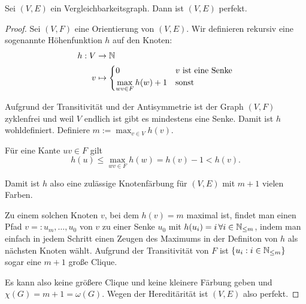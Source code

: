 \documentclass[../main.tex]{subfiles}
\begin{document}
\begin{satz}
    Sei $(V, E)$ ein Vergleichbarkeitsgraph. Dann ist $(V, E)$ perfekt.
\end{satz}
\begin{proof}
    Sei $(V, F)$ eine Orientierung von $(V, E)$. Wir definieren rekursiv eine sogenannte Höhenfunktion $h$ auf den Knoten:
    \begin{align*}
        h : V &\to \mathbb{N} \\
        v &\mapsto \begin{cases}
            0 &v \text{ ist eine Senke}\\
            \max\limits_{wv \in F} h(w) + 1 &\text {sonst}
        \end{cases}
    \end{align*}
    
    Aufgrund der Transitivität und der Antisymmetrie ist der Graph $(V, F)$ zyklenfrei und weil $V$ endlich ist gibt es mindestens eine Senke. Damit ist $h$ wohldefiniert. Definiere $m := \max_{v \in V} h(v)$.

    Für eine Kante $uv \in F$ gilt
    $$h(u) \leq \max\limits_{wv \in F} h(w) = h(v) - 1 < h(v).$$

    Damit ist $h$ also eine zulässige Knotenfärbung für $(V, E)$ mit $m + 1$ vielen Farben.
    
    Zu einem solchen Knoten $v$, bei dem $h(v) = m$ maximal ist, findet man einen Pfad $v =: u_m, \hdots, u_0$ von $v$ zu einer Senke $u_0$ mit $h(u_i) = i\, \forall i \in \mathbb{N}_{\leq m}$, indem man einfach in jedem Schritt einen Zeugen des Maximums in der Definiton von $h$ als nächsten Knoten wählt. Aufgrund der Transitivität von $F$ ist $\{u_i : i \in \mathbb{N}_{\leq m}\}$ sogar eine $m+1$ große Clique.
    
    Es kann also keine größere Clique und keine kleinere Färbung geben und $\chi(G) = m+1 = \omega(G)$. Wegen der Hereditärität ist $(V, E)$ also perfekt.
\end{proof}
\end{document}
